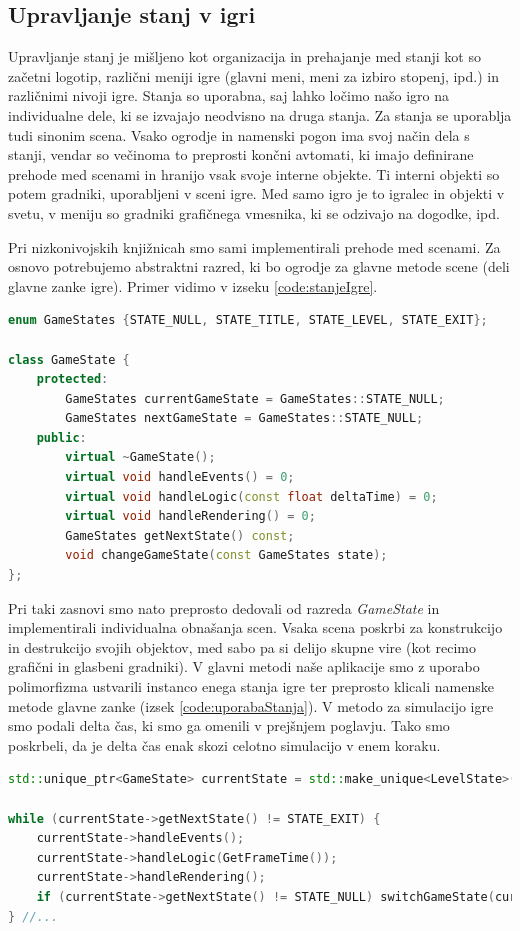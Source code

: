 \documentclass[12pt,a4paper,twoside]{book}
\begin{document}
\subsection{Upravljanje stanj v igri}
Upravljanje stanj je mišljeno kot organizacija in prehajanje med stanji kot so začetni logotip, različni meniji igre (glavni meni, meni za izbiro stopenj, ipd.) in različnimi nivoji igre. Stanja so uporabna, saj lahko ločimo našo igro na individualne dele, ki se izvajajo neodvisno na druga stanja. Za stanja se uporablja tudi sinonim scena. Vsako ogrodje in namenski pogon ima svoj način dela s stanji, vendar so večinoma to preprosti končni avtomati, ki imajo definirane prehode med scenami in hranijo vsak svoje interne objekte. Ti interni objekti so potem gradniki, uporabljeni v sceni igre. Med samo igro je to igralec in objekti v svetu, v meniju so gradniki grafičnega vmesnika, ki se odzivajo na dogodke, ipd.

Pri nizkonivojskih knjižnicah smo sami implementirali prehode med scenami. Za osnovo potrebujemo abstraktni razred, ki bo ogrodje za glavne metode scene (deli glavne zanke igre). Primer vidimo v izseku \ref{code:stanjeIgre}.

\begin{lstlisting}[label=code:stanjeIgre, language=C++, caption=Stanje igre]
enum GameStates {STATE_NULL, STATE_TITLE, STATE_LEVEL, STATE_EXIT};

class GameState {
	protected:
		GameStates currentGameState = GameStates::STATE_NULL;
		GameStates nextGameState = GameStates::STATE_NULL;
	public:
		virtual ~GameState();
		virtual void handleEvents() = 0;
		virtual void handleLogic(const float deltaTime) = 0;
		virtual void handleRendering() = 0;
		GameStates getNextState() const;
		void changeGameState(const GameStates state);
};
\end{lstlisting}

Pri taki zasnovi smo nato preprosto dedovali od razreda \textit{GameState} in implementirali individualna obnašanja scen. Vsaka scena poskrbi za konstrukcijo in destrukcijo svojih objektov, med sabo pa si delijo skupne vire (kot recimo grafični in glasbeni gradniki). V glavni metodi naše aplikacije smo z uporabo polimorfizma ustvarili instanco enega stanja igre ter preprosto klicali namenske metode glavne zanke (izsek \ref{code:uporabaStanja}). V metodo za simulacijo igre smo podali delta čas, ki smo ga omenili v prejšnjem poglavju. Tako smo poskrbeli, da je delta čas enak skozi celotno simulacijo v enem koraku.

\begin{lstlisting}[label=code:uporabaStanja, language=C++, caption=Uporaba stanja igre]
std::unique_ptr<GameState> currentState = std::make_unique<LevelState>();

while (currentState->getNextState() != STATE_EXIT) {
	currentState->handleEvents();
	currentState->handleLogic(GetFrameTime());
	currentState->handleRendering();
	if (currentState->getNextState() != STATE_NULL) switchGameState(currentState);
} //...
\end{lstlisting}
\end{document}
